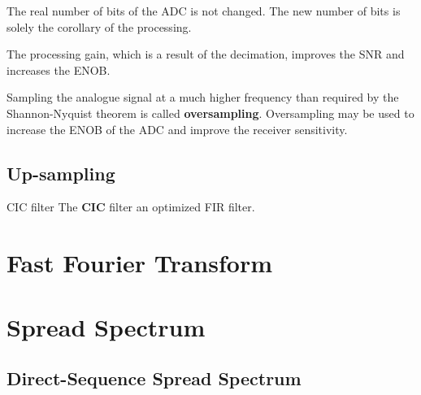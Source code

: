 \begin{refsection}
The real number of bits of the \ac{ADC} is not changed. The new number of bits is solely the corollary of the processing.

\begin{conclusion}
	The processing gain, which is a result of the decimation, improves the \ac{SNR} and increases the \ac{ENOB}.
	
	\vspace{0.5em}
	
	Sampling the analogue signal at a much higher frequency than required by the Shannon-Nyquist theorem is called  \textbf{oversampling}. Oversampling may be used to increase the \ac{ENOB} of the \ac{ADC} and improve the receiver sensitivity.
\end{conclusion}

\subsection{Up-sampling}



\begin{excursus}{\acs{CIC} filter}
	The  \textbf{\acf{CIC}} filter an optimized \ac{FIR} filter.
\end{excursus}


\section{Fast Fourier Transform}



\section{Spread Spectrum}




\subsection{Direct-Sequence Spread Spectrum}


\end{refsection}
